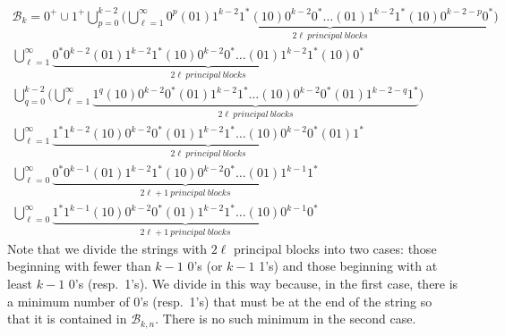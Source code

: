 \documentclass[12pt]{article}
\begin{document}
\begin{equation*}\begin{gathered}\mathscr{B}_k = 0^+\cup1^+\bigcup_{p=0}^{k-2}\big(\bigcup_{\ell=1}^{\infty} \underbrace{0^p(01)1^{k-2}1^*(10)0^{k-2}0^*\dots(01)1^{k-2}1^*(10)0^{k-2-p}0^*}_{2\ell~principal~blocks} \big)\\
\bigcup_{\ell=1}^{\infty} \underbrace{0^*0^{k-2}(01)1^{k-2}1^*(10)0^{k-2}0^*\dots(01)1^{k-2}1^*(10)0^*}_{2\ell~principal~blocks} \\
\bigcup_{q=0}^{k-2}\big(\bigcup_{\ell=1}^{\infty} \underbrace{1^q(10)0^{k-2}0^*(01)1^{k-2}1^*\dots(10)0^{k-2}0^*(01)1^{k-2-q}1^*}_{2\ell~principal~blocks} \big)\\
\bigcup_{\ell=1}^{\infty} \underbrace{1^*1^{k-2}(10)0^{k-2}0^*(01)1^{k-2}1^*\dots(10)0^{k-2}0^*(01)1^*}_{2\ell~principal~blocks}\\
\bigcup_{\ell=0}^{\infty}\underbrace{0^*0^{k-1}(01)1^{k-2}1^*(10)0^{k-2}0^*\dots(01)1^{k-1}1^*}_{2\ell+1~principal~blocks} \\
\bigcup_{\ell=0}^{\infty}\underbrace{1^*1^{k-1}(10)0^{k-2}0^*(01)1^{k-2}1^*\dots(10)0^{k-1}0^*}_{2\ell+1~principal~blocks}\end{gathered}\end{equation*} 
Note that we divide the strings with $2\ell$ principal blocks into two cases: those beginning with fewer than $k-1$ 0's (or $k-1$ 1's) and those beginning with at least $k-1$ 0's (resp.~1's). We divide in this way because, in the first case, there is a minimum number of 0's (resp.~1's) that must be at the end of the string so that it is contained in $\mathscr{B}_{k,n}$. There is no such minimum in the second case. 
\end{document}
